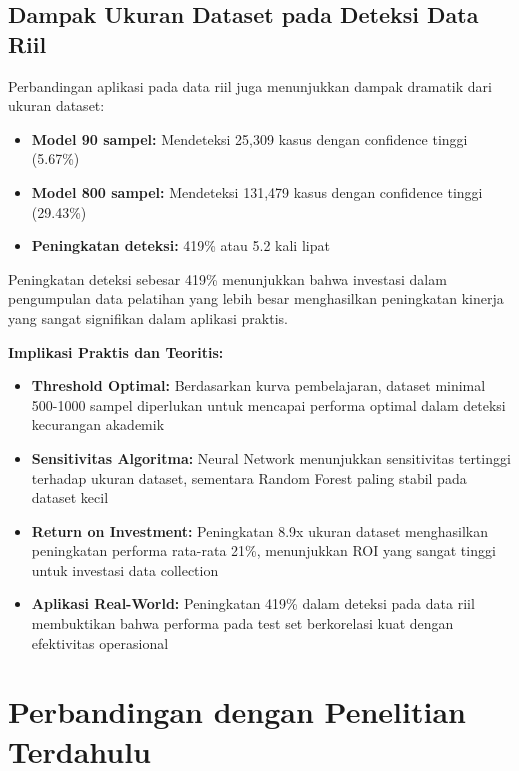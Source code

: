 \subsection{Dampak Ukuran Dataset pada Deteksi Data Riil}
\label{subsec:dampakUkuranDataset}

Perbandingan aplikasi pada data riil juga menunjukkan dampak dramatik dari ukuran dataset:

\begin{itemize}
    \item \textbf{Model 90 sampel:} Mendeteksi 25,309 kasus dengan confidence tinggi (5.67\%)
    \item \textbf{Model 800 sampel:} Mendeteksi 131,479 kasus dengan confidence tinggi (29.43\%)
    \item \textbf{Peningkatan deteksi:} 419\% atau 5.2 kali lipat
\end{itemize}

Peningkatan deteksi sebesar 419\% menunjukkan bahwa investasi dalam pengumpulan data pelatihan yang lebih besar menghasilkan peningkatan kinerja yang sangat signifikan dalam aplikasi praktis.

\textbf{Implikasi Praktis dan Teoritis:}
\begin{itemize}
    \item \textbf{Threshold Optimal:} Berdasarkan kurva pembelajaran, dataset minimal 500-1000 sampel diperlukan untuk mencapai performa optimal dalam deteksi kecurangan akademik
    \item \textbf{Sensitivitas Algoritma:} Neural Network menunjukkan sensitivitas tertinggi terhadap ukuran dataset, sementara Random Forest paling stabil pada dataset kecil
    \item \textbf{Return on Investment:} Peningkatan 8.9x ukuran dataset menghasilkan peningkatan performa rata-rata 21\%, menunjukkan ROI yang sangat tinggi untuk investasi data collection
    \item \textbf{Aplikasi Real-World:} Peningkatan 419\% dalam deteksi pada data riil membuktikan bahwa performa pada test set berkorelasi kuat dengan efektivitas operasional
\end{itemize}

\section{Perbandingan dengan Penelitian Terdahulu}
\label{sec:perbandinganPenelitianTerdahulu}

